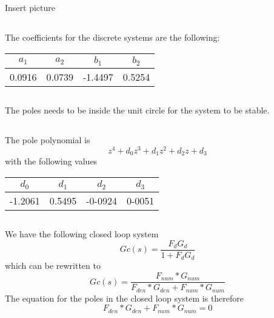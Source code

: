 \documentclass[12pt,a4paper]{article}
\begin{document}
\subsection{}%

\subsection{}%
Insert picture
\subsection{}%
The coefficients for the discrete systems are the following:
\begin{center}
	\begin{tabular}{| c | c | c | c |}
	\hline
	$a_1$ & $a_2$ & $b_1$ & $b_2$ \\
	\hline
	0.0916 & 0.0739 & -1.4497 & 0.5254 \\
	\hline
	\end{tabular}
\end{center}

\subsection{}%
The poles needs to be inside the unit circle for the system to be stable.

\subsection{}%
The pole polynomial is
	\begin{equation}
		z^4+d_0z^3+d_1z^2+d_2z +d_3
	\end{equation}
	with the following values
\begin{center}
	\begin{tabular}{| c | c | c | c |}
	\hline
	$d_0$ & $d_1$ & $d_2$ & $d_3$ \\
	\hline
	-1.2061 & 0.5495 & -0-0924 & 0-0051 \\
	\hline
	\end{tabular}
\end{center}

\subsection{} %
We have the following closed loop system
\begin{equation}
	Gc(s) = \frac{F_dG_d}{1+F_dG_d}
\end{equation}
which can be rewritten to
\begin{equation}
	Gc(s) = \frac{F_{num}*G_{num}}{F_{den}*G_{den}+F_{num}*G_{num}}
\end{equation}
The equation for the poles in the closed loop system is therefore
\begin{equation}
	F_{den}*G_{den}+F_{num}*G_{num} = 0
\end{equation}
\end{document}
